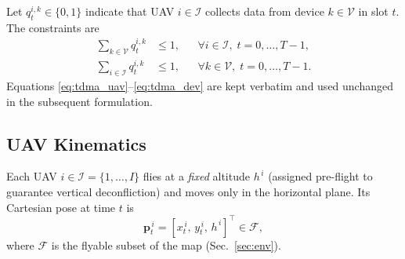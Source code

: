 \documentclass[drones,article,accept,pdftex,moreauthors]{Definitions/mdpi}
\begin{document}
Let $q_{t}^{i,k}\!\in\!\{0,1\}$ indicate that UAV $i\in\mathcal{I}$ collects data from device
$k\in\mathcal{V}$ in slot $t$. The constraints are
\begin{subequations}\label{eq:tdma}
\begin{align}
\sum_{k\in\mathcal{V}} q_{t}^{i,k} &\le 1, && \forall i\in\mathcal{I},\; t=0,\dots,T-1, \label{eq:tdma_uav}\\
\sum_{i\in\mathcal{I}} q_{t}^{i,k} &\le 1, && \forall k\in\mathcal{V},\; t=0,\dots,T-1. \label{eq:tdma_dev}
\end{align}
\end{subequations}
Equations \eqref{eq:tdma_uav}–\eqref{eq:tdma_dev} are kept verbatim and used unchanged
in the subsequent formulation.

\subsection{UAV Kinematics}\label{sec:kin}

Each UAV \(i\in\mathcal{I}=\{1,\dots,I\}\) flies at a \emph{fixed} altitude \(h^{\,i}\) (assigned
pre-flight to guarantee vertical deconfliction) and moves only in the horizontal plane.
Its Cartesian pose at time \(t\) is
\[
\mathbf{p}_t^{\,i} = [x_t^{\,i},\, y_t^{\,i},\, h^{\,i}]^{\top} \in \mathcal{F},
\]
where \(\mathcal{F}\) is the flyable subset of the map (Sec.~\ref{sec:env}).
\end{document}
